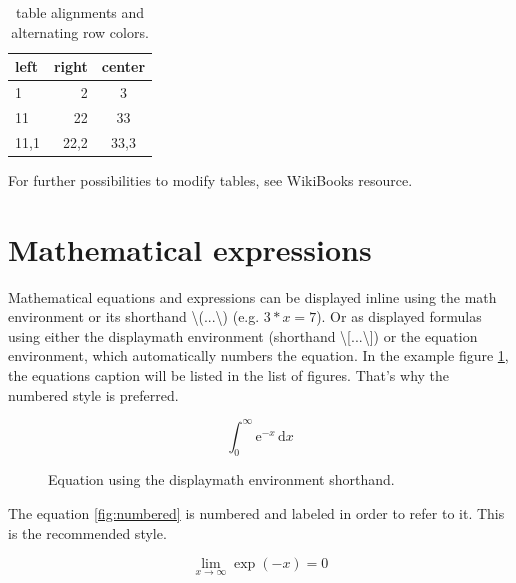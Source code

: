 \begin{table}[ht]
\centering
\begin{tabular}{ l | r | c }
\rowcolor{gray!40}
left & right & center  \\ \hline\hline
1 & 2 & 3 \\ \hline
11 & 22 & 33 \\ \hline
11,1 & 22,2 & 33,3 \\ 
\end{tabular}
\caption{table alignments and alternating row colors.}
\label{table:alignment}
\end{table} 

For further possibilities to modify tables, see WikiBooks resource.

\section{Mathematical expressions}
Mathematical equations and expressions can be displayed inline using the math environment or its shorthand \textbackslash(...\textbackslash) (e.g. \( 3*x = 7 \)). Or as displayed formulas using either the displaymath environment (shorthand \textbackslash[...\textbackslash]) or the equation environment, which automatically numbers the equation. In the example figure \ref{fig:integral}, the equations caption will be listed in the list of figures. That's why the numbered style is preferred.

\begin{figure}[h]
\[ \int_0^\infty \mathrm{e}^{-x}\,\mathrm{d}x \]
\caption{Equation using the displaymath environment shorthand. }
\label{fig:integral}
\end{figure}

The equation \ref{fig:numbered} is numbered and labeled in order to refer to it. This is the recommended style.

\begin{equation}
\lim_{x \to \infty} \exp(-x) = 0
\label{fig:numbered}
\end{equation}















